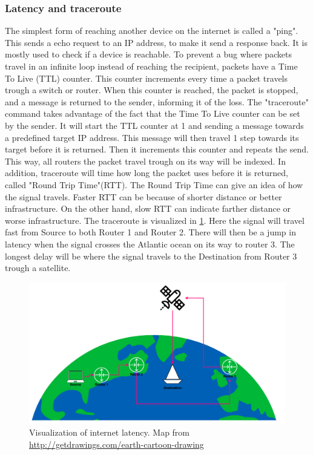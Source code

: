 \subsubsection{Latency and traceroute} \label{sec:latency_method}
The simplest form of reaching another device on the internet is called a "ping". This sends a echo request to an IP address, to make it send a response back. It is mostly used to check if a device is reachable. To prevent a bug where packets travel in an infinite loop instead of reaching the recipient, packets have a Time To Live (TTL) counter. This counter increments every time a packet travels trough a switch or router. When this counter is reached, the packet is stopped, and a message is returned to the sender, informing it of the loss.
The "traceroute" command takes advantage of the fact that the Time To Live counter can be set by the sender. It will start the TTL counter at 1 and sending a message towards a predefined target IP address. This message will then travel 1 step towards its target before it is returned. Then it increments this counter and repeats the send. This way, all routers the packet travel trough on its way will be indexed. In addition, traceroute will time how long the packet uses before it is returned, called "Round Trip Time"(RTT).
The Round Trip Time can give an idea of how the signal travels. Faster RTT can be because of shorter distance or better infrastructure. On the other hand, slow RTT can indicate farther distance or worse infrastructure.
The traceroute is visualized in \cref{fig:latency}. Here the signal will travel fast from Source to both Router 1 and Router 2. There will then be a jump in latency when the signal crosses the Atlantic ocean on its way to router 3. The longest delay will be where the signal travels to the Destination from Router 3 trough a satellite.

\begin{figure} [H]
    \centering
    \includegraphics[scale=0.3]{Figurer/latency.png}
    \caption{Visualization of internet latency. Map from \href{http://getdrawings.com/earth-cartoon-drawing}{http://getdrawings.com/earth-cartoon-drawing}}
    \label{fig:latency}
\end{figure}


